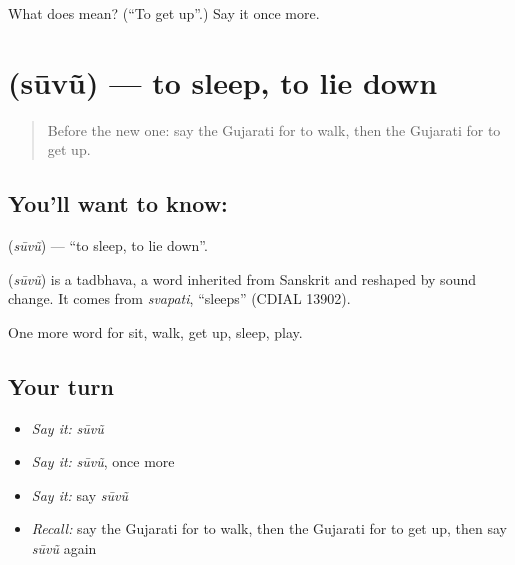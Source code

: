\begin{tcolorbox}[breakable,colback=teal!4,colframe=teal!35!black,title={Before you move on}]
What does  mean? (\textquotedblleft{}To get up\textquotedblright{}.) Say it once more.
\end{tcolorbox}
\section[\texorpdfstring{\gu{સૂવું} (sūvũ)}{સૂવું (sūvũ)}]{ (sūvũ) — to sleep, to lie down}

\label{lesson:GU-C54-suvu}



\begin{quote}
Before the new one: say the Gujarati for to walk, then the Gujarati for to get up.
\end{quote}

\subsection*{You'll want to know: }
\textbf{} (\emph{sūvũ}) — \textquotedblleft{}to sleep, to lie down\textquotedblright{}.

\begin{cousinweb}
\textbf{} (\emph{sūvũ}) is a tadbhava, a word inherited from Sanskrit and reshaped by sound change. It comes from \emph{svapati}, \textquotedblleft{}sleeps\textquotedblright{} (CDIAL 13902).
\end{cousinweb}

\begin{grammarlens}[title={What you've built}]
One more word for sit, walk, get up, sleep, play.
\end{grammarlens}

\subsection*{Your turn}
\begin{itemize}
\raggedright
  \item \emph{Say it:} \emph{sūvũ}
  \item \emph{Say it:} \emph{sūvũ}, once more
  \item \emph{Say it:} say \emph{sūvũ}
  \item \emph{Recall:} say the Gujarati for to walk, then the Gujarati for to get up, then say \emph{sūvũ} again
\end{itemize}


